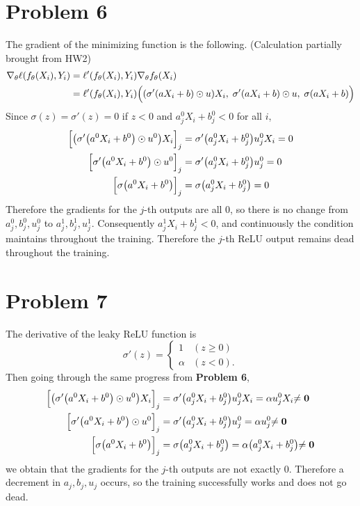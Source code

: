 \documentclass[10pt]{article}
\begin{document}
\section*{Problem 6}
The gradient of the minimizing function is the following. (Calculation partially brought from HW2)
\begin{align*}
    \nabla_\theta \ell\qty(f_\theta(X_i), Y_i) &= \ell'\qty(f_\theta(X_i), Y_i)\nabla_\theta f_\theta(X_i) \\
    &= \ell'\qty(f_\theta(X_i), Y_i) \Big(\qty(\sigma ' \qty(aX_i+b)\odot u)X_i, \; \sigma ' \qty(aX_i+b)\odot u, \; \sigma\qty(aX_i+b)\Big)
\end{align*}
Since $\sigma(z) = \sigma'(z) = 0$ if $z<0$ and $a_j^0X_i + b_j^0 < 0$ for all $i$,
\begin{align*}
    \Big[\qty(\sigma ' \qty(a^0X_i+b^0)\odot u^0)X_i\Big]_j &= \sigma ' \qty(a_j^0X_i+b_j^0) u_j^0X_i = 0 \\
    \Big[\sigma ' \qty(a^0X_i+b^0)\odot u^0\Big]_j &= \sigma ' \qty(a_j^0X_i+b_j^0) u_j^0 = 0 \\
    \Big[\sigma\qty(a^0X_i+b^0)\Big]_j &= \sigma\qty(a_j^0X_i+b_j^0) = 0
\end{align*}
Therefore the gradients for the $j$-th outputs are all 0, so there is no change from $a_j^0, b_j^0, u_j^0$ to $a_j^1, b_j^1, u_j^1$.
Consequently $a_j^1X_i + b_j^1 < 0$, and continuously the condition maintains throughout the training. Therefore the $j$-th ReLU output remains dead throughout the training.

\section*{Problem 7}
The derivative of the leaky ReLU function is
$$\sigma'(z) = \begin{cases}
    1 & (z \geq 0) \\ \alpha & (z < 0).
\end{cases}$$
Then going through the same progress from \textbf{Problem 6},
\begin{align*}
    \Big[\qty(\sigma ' \qty(a^0X_i+b^0)\odot u^0)X_i\Big]_j &= \sigma ' \qty(a_j^0X_i+b_j^0) u_j^0X_i = \alpha u_j^0X_i \mathbf{\neq 0} \\
    \Big[\sigma ' \qty(a^0X_i+b^0)\odot u^0\Big]_j &= \sigma ' \qty(a_j^0X_i+b_j^0) u_j^0 = \alpha u_j^0 \mathbf{\neq 0} \\
    \Big[\sigma\qty(a^0X_i+b^0)\Big]_j &= \sigma\qty(a_j^0X_i+b_j^0) = \alpha\qty(a_j^0X_i+b_j^0) \mathbf{\neq 0}
\end{align*}
we obtain that the gradients for the $j$-th outputs are not exactly 0.
Therefore a decrement in $a_j, b_j, u_j$ occurs, so the training successfully works and does not go dead.
\end{document}
